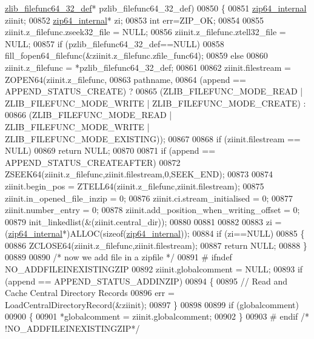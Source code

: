 \begin{DoxyCode}
      \hyperlink{structzlib__filefunc64__32__def__s}{zlib\_filefunc64\_32\_def}* pzlib\_filefunc64\_32\_def)
00850 \{
00851     \hyperlink{structzip64__internal}{zip64\_internal} ziinit;
00852     \hyperlink{structzip64__internal}{zip64\_internal}* zi;
00853     \textcolor{keywordtype}{int} err=ZIP\_OK;
00854 
00855     ziinit.z\_filefunc.zseek32\_file = NULL;
00856     ziinit.z\_filefunc.ztell32\_file = NULL;
00857     \textcolor{keywordflow}{if} (pzlib\_filefunc64\_32\_def==NULL)
00858         fill\_fopen64\_filefunc(&ziinit.z\_filefunc.zfile\_func64);
00859     \textcolor{keywordflow}{else}
00860         ziinit.z\_filefunc = *pzlib\_filefunc64\_32\_def;
00861 
00862     ziinit.filestream = ZOPEN64(ziinit.z\_filefunc,
00863                   pathname,
00864                   (append == APPEND\_STATUS\_CREATE) ?
00865                   (ZLIB\_FILEFUNC\_MODE\_READ | ZLIB\_FILEFUNC\_MODE\_WRITE | ZLIB\_FILEFUNC\_MODE\_CREATE) :
00866                     (ZLIB\_FILEFUNC\_MODE\_READ | ZLIB\_FILEFUNC\_MODE\_WRITE | ZLIB\_FILEFUNC\_MODE\_EXISTING));
00867 
00868     \textcolor{keywordflow}{if} (ziinit.filestream == NULL)
00869         \textcolor{keywordflow}{return} NULL;
00870 
00871     \textcolor{keywordflow}{if} (append == APPEND\_STATUS\_CREATEAFTER)
00872         ZSEEK64(ziinit.z\_filefunc,ziinit.filestream,0,SEEK\_END);
00873 
00874     ziinit.begin\_pos = ZTELL64(ziinit.z\_filefunc,ziinit.filestream);
00875     ziinit.in\_opened\_file\_inzip = 0;
00876     ziinit.ci.stream\_initialised = 0;
00877     ziinit.number\_entry = 0;
00878     ziinit.add\_position\_when\_writing\_offset = 0;
00879     init\_linkedlist(&(ziinit.central\_dir));
00880 
00881 
00882 
00883     zi = (\hyperlink{structzip64__internal}{zip64\_internal}*)ALLOC(\textcolor{keyword}{sizeof}(\hyperlink{structzip64__internal}{zip64\_internal}));
00884     \textcolor{keywordflow}{if} (zi==NULL)
00885     \{
00886         ZCLOSE64(ziinit.z\_filefunc,ziinit.filestream);
00887         \textcolor{keywordflow}{return} NULL;
00888     \}
00889 
00890     \textcolor{comment}{/* now we add file in a zipfile */}
00891 \textcolor{preprocessor}{#    ifndef NO\_ADDFILEINEXISTINGZIP}
00892     ziinit.globalcomment = NULL;
00893     \textcolor{keywordflow}{if} (append == APPEND\_STATUS\_ADDINZIP)
00894     \{
00895       \textcolor{comment}{// Read and Cache Central Directory Records}
00896       err = LoadCentralDirectoryRecord(&ziinit);
00897     \}
00898 
00899     \textcolor{keywordflow}{if} (globalcomment)
00900     \{
00901       *globalcomment = ziinit.globalcomment;
00902     \}
00903 \textcolor{preprocessor}{#    endif }\textcolor{comment}{/* !NO\_ADDFILEINEXISTINGZIP*/}\textcolor{preprocessor}{}

\end{DoxyCode}
